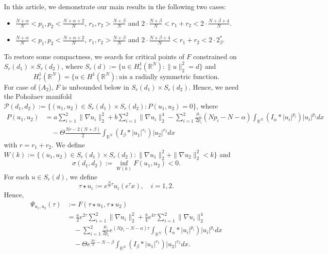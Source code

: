 \documentclass[10pt,a4paper]{amsart}
\numberwithin{equation}{section}
\begin{document}
In this article, we demonstrate our main results in the following two cases:
\begin{itemize}
\item[(A1)] $\frac{N+\alpha}{N}<p_1,p_2<\frac{N+\alpha+2}{N}$,
$r_1,r_2>\frac{N+\beta}{N}$ and
$2\cdot\frac{N+\beta}{N}<r_1+r_2<2\cdot\frac{N+\beta+4}{N}$.

\item[(A2)]  $\frac{N+\alpha}{N}<p_1,p_2<\frac{N+\alpha+2}{N}$,
$r_1,r_2>\frac{N+\beta}{N}$ and $2\cdot\frac{N+\beta+4}{N}<r_1+r_2<2\cdot2_\beta^*$.
\end{itemize}
To restore some compactness, we search for critical points of $F$ constrained on
$S_r(d_1)\times S_r(d_2)$,
where $S_r(d):=\{u\in H_r^1(\mathbb{R}^N):\| u\|_2^2=d\}$ and
\[
H_r^1(\mathbb{R}^N)=\{u\in H^1(\mathbb{R}^N):
 u \text{is a radially symmetric function}.
\] 
For case of ($A_2$), $F$ is unbounded below in $S_r(d_1)\times S_r(d_2)$.
Hence, we need the Poho\v{z}aev manifold
$\mathcal{P}(d_1,d_2):=\{(u_1,u_2)\in S_r(d_1)\times S_r(d_2): P(u_1,u_2)=0\}$, where
\begin{align*}
P(u_1,u_2)
&=a\sum_{i=1}^2\| \nabla u_i\|_2^2+b\sum_{i=1}^2\| \nabla u_i\|_2^4
-\sum_{i=1}^2\frac{\mu_i}{2p_i}(Np_i-N-\alpha)
 \int_{\mathbb{R}^N}(I_\alpha\ast|u_i|^{p_i})|u_i|^{p_i}dx\\
&\quad-\Theta\frac{Nr-2(N+\beta)}{2}\int_{\mathbb{R}^N}(I_\beta\ast|u_1|^{r_1})
|u_2|^{r_2}dx
\end{align*}
with $r=r_1+r_2$. We define $W(k):=\{(u_1,u_2)\in S_r(d_1)\times
S_r(d_2):\| \nabla u_1\|_2^2+\| \nabla u_2\|_2^2<k\}$
and
\begin{equation}\label{jxh25}
 \sigma(d_1,d_2):=\inf_{W(k)}F(u_1,u_2)<0.
\end{equation}
For each $u\in S_r(d)$, we define
\[
 \tau\star u_i:=e^{\frac{N}{2}\tau}u_i(e^{\tau}x), \quad i=1,2.
\]
Hence,
\begin{equation}
\begin{aligned}
\Psi_{u_1,u_2}(\tau)
&:=F(\tau\star u_1,\tau\star u_2)\\
&=\frac{a}{2}e^{2\tau}\sum_{i=1}^2\|\nabla u_i\|_2^2
 +\frac{b}{4}e^{4\tau}\sum_{i=1}^2\|\nabla u_i\|_2^4\\
&\quad-\sum_{i=1}^2\frac{\mu_i}{2p_i}e^{(Np_i-N-\alpha)\tau}
 \int_{\mathbb{R}^N}(I_\alpha\ast|u_i|^{p_i})|u_i|^{p_i}dx\\
&\quad -\Theta e^{\frac{Nr}{2}-N-\beta}
 \int_{\mathbb{R}^N}(I_\beta\ast|u_1|^{r_1})|u_2|^{r_2}dx.
\end{aligned}
\end{equation}
\end{document}

